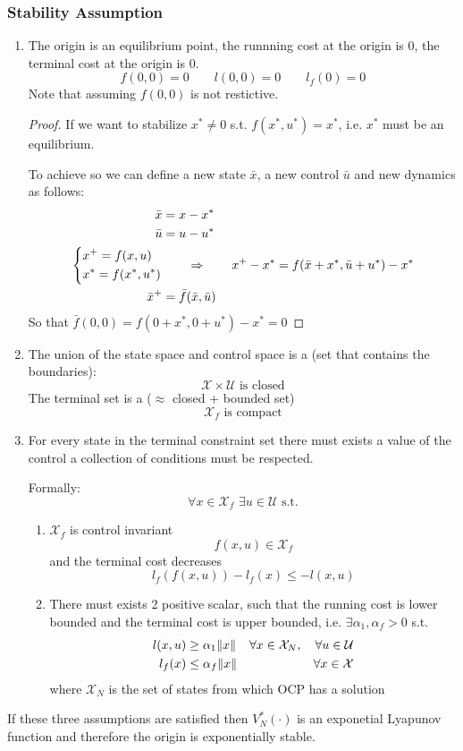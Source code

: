\subsubsection{Stability Assumption}
\begin{enumerate}[label={\textbf{Ass. \#\arabic*}:}, leftmargin = 3cm]
\item The origin is an equilibrium point, the runnning cost at the origin is 0, the terminal cost at the origin is 0.
\[f(0,0)= 0\qquad l(0,0) = 0\qquad l_f(0) = 0\]
Note that assuming $f(0,0)$ is not restictive.
\begin{proof}
If we want to stabilize $x^* \ne 0$ s.t. $f(x^*, u^*) = x^*$, i.e. $x^*$ must be an equilibrium.

To achieve so we can define a new state $\bar{x}$, a new control $\bar{u}$ and new dynamics as follows:
\begin{align*}
\bar{x} &= x - x^*\\
\bar{u} &= u - u^*\\
\begin{dcases}
x^+ = f(x,u)\\
x^* = f(x^*, u^*)
\end{dcases}
&\qquad\Rightarrow\qquad
x^+ - x^* = f(\bar{x}+x^*, \bar{u} + u^*) - x^*\\
\bar{x}^+ &= \bar{f}(\bar{x}, \bar{u})
\end{align*}
So that $\bar{f}(0,0) = f(0+x^*, 0+u^*) - x^* = 0$
\end{proof}
\item The union of the state space and control space is a  (set that contains the boundaries):
\[\mathcal{X} \times \mathcal{U} \text{ is closed}\]
The terminal set is a  ($\approx$ closed + bounded set)
\[\mathcal{X}_f \text{ is compact}\]

\item  For every state in the terminal constraint set there must exists a value of the control a collection of conditions must be respected.

Formally:
\[\forall x \in \mathcal{X}_f\,\,\exists u \in \mathcal{U} \text{ s.t.}\]
\begin{enumerate}
\item $\mathcal{X}_f$ is control invariant
\[f(x,u)\in \mathcal{X}_f\]
and the terminal cost decreases
\[l_f(f(x,u)) - l_f(x) \le - l(x,u)\]
\item There must exists 2 positive scalar, such that the running cost is lower bounded and the terminal cost is upper bounded, i.e.
$\exists \alpha_1, \alpha_f > 0$ s.t.
\begin{align*}
l(x,u)&\ge \alpha_1 \lVert x\rVert & \forall x\in \mathcal{X}_N, \quad \forall u\in\mathcal{U}\\
l_f(x)&\le \alpha_f \lVert x\rVert & \forall x \in \mathcal{X}
\end{align*}
where $\mathcal{X}_N$ is the set of states from which OCP has a solution
\end{enumerate}
\end{enumerate}
If these three assumptions are satisfied then $V_N^*(\cdot)$ is an exponetial Lyapunov function and therefore the origin is exponentially stable.



